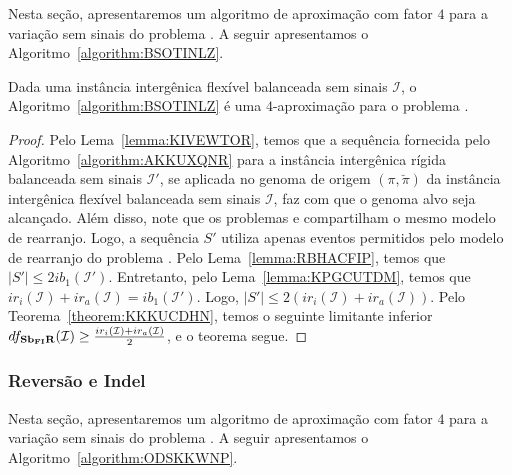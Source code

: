 Nesta seção, apresentaremos um algoritmo de aproximação com fator $4$ para a variação sem sinais do problema \SbFIR{}. A seguir apresentamos o Algoritmo~\ref{algorithm:BSOTINLZ}.



\begin{theorem}\label{theorem:WKATVVBS}
Dada uma instância intergênica flexível balanceada sem sinais $\mathcal{I}$, o Algoritmo~\ref{algorithm:BSOTINLZ} é uma $4$-aproximação para o problema \SbFIR{}.
\end{theorem}
\begin{proof}
Pelo Lema~\ref{lemma:KIVEWTOR}, temos que a sequência fornecida pelo Algoritmo~\ref{algorithm:AKKUXQNR} para a instância intergênica rígida balanceada sem sinais $\mathcal{I'}$, se aplicada no genoma de origem $(\pi,\breve\pi)$ da instância intergênica flexível balanceada sem sinais $\mathcal{I}$, faz com que o genoma alvo seja alcançado. Além disso, note que os problemas \SbIR{} e \SbFIR{} compartilham o mesmo modelo de rearranjo. Logo, a sequência $S'$ utiliza apenas eventos permitidos pelo modelo de rearranjo do problema \SbFIR{}. Pelo Lema~\ref{lemma:RBHACFIP}, temos que $|S'| \le 2ib_1(\mathcal{I'})$. Entretanto, pelo Lema~\ref{lemma:KPGCUTDM}, temos que $ir_i(\mathcal{I}) + ir_a(\mathcal{I}) = ib_1(\mathcal{I'})$. Logo, $|S'| \le 2(ir_i(\mathcal{I}) + ir_a(\mathcal{I}))$. Pelo Teorema~\ref{theorem:KKKUCDHN}, temos o seguinte limitante inferior $df_{\textbf{Sb\textsubscript{FI}R}}(\mathcal{I}) \ge \frac{ir_i(\mathcal{I}) + ir_a(\mathcal{I})}{2}$, e o teorema segue.
\end{proof}

\subsubsection{Reversão e Indel}

Nesta seção, apresentaremos um algoritmo de aproximação com fator $4$ para a variação sem sinais do problema \SbFIRI{}. A seguir apresentamos o Algoritmo~\ref{algorithm:ODSKKWNP}.



